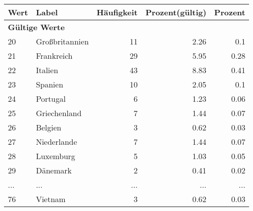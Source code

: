      \begin{longtable}{lXrrr}
     \toprule
     \textbf{Wert} & \textbf{Label} & \textbf{Häufigkeit} & \textbf{Prozent(gültig)} & \textbf{Prozent} \\
     \endhead
     \midrule
     \multicolumn{5}{l}{\textbf{Gültige Werte}}\\
        20 & \multicolumn{1}{X}{Großbritannien} & %
          \num{11} &
          \num[round-mode=places,round-precision=2]{2,26} &
          \num[round-mode=places,round-precision=2]{0,1} \\
        21 & \multicolumn{1}{X}{Frankreich} & %
          \num{29} &
          \num[round-mode=places,round-precision=2]{5,95} &
          \num[round-mode=places,round-precision=2]{0,28} \\
        22 & \multicolumn{1}{X}{Italien} & %
          \num{43} &
          \num[round-mode=places,round-precision=2]{8,83} &
          \num[round-mode=places,round-precision=2]{0,41} \\
        23 & \multicolumn{1}{X}{Spanien} & %
          \num{10} &
          \num[round-mode=places,round-precision=2]{2,05} &
          \num[round-mode=places,round-precision=2]{0,1} \\
        24 & \multicolumn{1}{X}{Portugal} & %
          \num{6} &
          \num[round-mode=places,round-precision=2]{1,23} &
          \num[round-mode=places,round-precision=2]{0,06} \\
        25 & \multicolumn{1}{X}{Griechenland} & %
          \num{7} &
          \num[round-mode=places,round-precision=2]{1,44} &
          \num[round-mode=places,round-precision=2]{0,07} \\
        26 & \multicolumn{1}{X}{Belgien} & %
          \num{3} &
          \num[round-mode=places,round-precision=2]{0,62} &
          \num[round-mode=places,round-precision=2]{0,03} \\
        27 & \multicolumn{1}{X}{Niederlande} & %
          \num{7} &
          \num[round-mode=places,round-precision=2]{1,44} &
          \num[round-mode=places,round-precision=2]{0,07} \\
        28 & \multicolumn{1}{X}{Luxemburg} & %
          \num{5} &
          \num[round-mode=places,round-precision=2]{1,03} &
          \num[round-mode=places,round-precision=2]{0,05} \\
        29 & \multicolumn{1}{X}{Dänemark} & %
          \num{2} &
          \num[round-mode=places,round-precision=2]{0,41} &
          \num[round-mode=places,round-precision=2]{0,02} \\
       ... & ... & ... & ... & ... \\
        76 & \multicolumn{1}{X}{Vietnam} & %
          \num{3} &
          \num[round-mode=places,round-precision=2]{0,62} &
          \num[round-mode=places,round-precision=2]{0,03} \\


\end{longtable}
